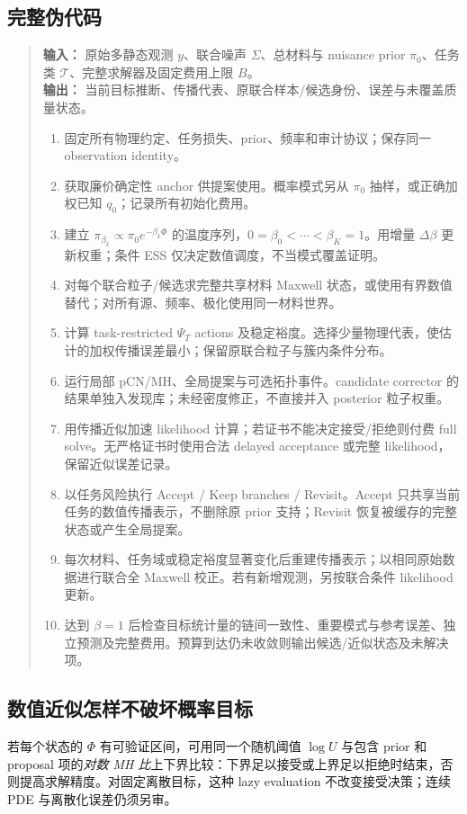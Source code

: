 \subsection{完整伪代码}
\begin{quote}
\textbf{输入：} 原始多静态观测 $y$、联合噪声 $\Sigma$、总材料与 nuisance prior $\pi_0$、任务类 $\mathcal T$、完整求解器及固定费用上限 $B$。\\
\textbf{输出：} 当前目标推断、传播代表、原联合样本/候选身份、误差与未覆盖质量状态。

\begin{enumerate}
\item 固定所有物理约定、任务损失、prior、频率和审计协议；保存同一 observation identity。
\item 获取廉价确定性 anchor 供提案使用。概率模式另从 $\pi_0$ 抽样，或正确加权已知 $q_0$；记录所有初始化费用。
\item 建立 $\pi_{\beta_k}\propto\pi_0e^{-\beta_k\Phi}$ 的温度序列，$0=\beta_0<\cdots<\beta_K=1$。用增量 $\Delta\beta$ 更新权重；条件 ESS 仅决定数值调度，不当模式覆盖证明。
\item 对每个联合粒子/候选求完整共享材料 Maxwell 状态，或使用有界数值替代；对所有源、频率、极化使用同一材料世界。
\item 计算 task-restricted $\Psi_T$ actions 及稳定裕度。选择少量物理代表，使估计的加权传播误差最小；保留原联合粒子与簇内条件分布。
\item 运行局部 pCN/MH、全局提案与可选拓扑事件。candidate corrector 的结果单独入发现库；未经密度修正，不直接并入 posterior 粒子权重。
\item 用传播近似加速 likelihood 计算；若证书不能决定接受/拒绝则付费 full solve。无严格证书时使用合法 delayed acceptance 或完整 likelihood，保留近似误差记录。
\item 以任务风险执行 Accept / Keep branches / Revisit。Accept 只共享当前任务的数值传播表示，不删除原 prior 支持；Revisit 恢复被缓存的完整状态或产生全局提案。
\item 每次材料、任务域或稳定裕度显著变化后重建传播表示；以相同原始数据进行联合全 Maxwell 校正。若有新增观测，另按联合条件 likelihood 更新。
\item 达到 $\beta=1$ 后检查目标统计量的链间一致性、重要模式与参考误差、独立预测及完整费用。预算到达仍未收敛则输出候选/近似状态及未解决项。
\end{enumerate}
\end{quote}

\subsection{数值近似怎样不破坏概率目标}
若每个状态的 $\Phi$ 有可验证区间，可用同一个随机阈值 $\log U$ 与包含 prior 和 proposal 项的\emph{对数 MH 比}上下界比较：下界足以接受或上界足以拒绝时结束，否则提高求解精度。对固定离散目标，这种 lazy evaluation 不改变接受决策；连续 PDE 与离散化误差仍须另审。

